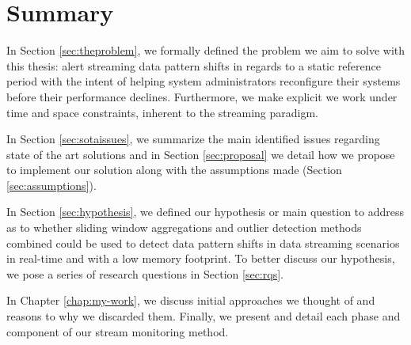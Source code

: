 \section{Summary}
In Section \ref{sec:theproblem}, we formally defined the problem we aim to solve with this thesis: alert streaming data pattern shifts in regards to a static reference period with the intent of helping system administrators reconfigure their systems before their performance declines. Furthermore, we make explicit we work under time and space constraints, inherent to the streaming paradigm.

In Section \ref{sec:sotaissues}, we summarize the main identified issues regarding state of the art solutions and in Section \ref{sec:proposal} we detail how we propose to implement our solution along with the assumptions made (Section \ref{sec:assumptions}).

In Section \ref{sec:hypothesis}, we defined our hypothesis or main question to address as to whether sliding window aggregations and outlier detection methods combined could be used to detect data pattern shifts in data streaming scenarios in real-time and with a low memory footprint. To better discuss our hypothesis, we pose a series of research questions in Section \ref{sec:rqs}.

In Chapter \ref{chap:my-work}, we discuss initial approaches we thought of and reasons to why we discarded them. Finally, we present and detail each phase and component of our stream monitoring method.

